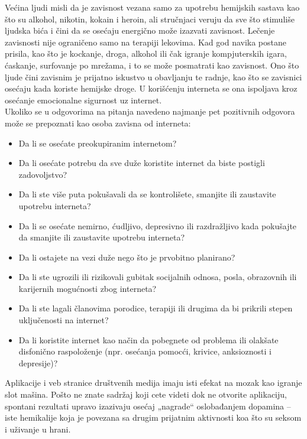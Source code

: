 \documentclass[a4paper]{article}
\begin{document}
{		Većina ljudi misli da je zavisnost vezana samo za upotrebu hemijskih sastava kao što su alkohol, nikotin, kokain i heroin, ali stručnjaci veruju da sve što stimuliše ljudska bića i čini da se osećaju energično može izazvati zavisnost. Lečenje zavisnosti nije ograničeno samo na terapiji lekovima. Kad god navika postane prisila, kao što je kockanje, droga, alkohol ili čak igranje kompjuterskih igara, ćaskanje, surfovanje po mrežama, i to se može posmatrati kao zavisnost. Ono što ljude čini zavisnim je prijatno iskustvo u obavljanju te radnje, kao što se zavisnici osećaju kada koriste hemijske droge. U korišćenju interneta se ona ispoljava kroz osećanje emocionalne sigurnost uz internet.\\
		Ukoliko se u odgovorima na pitanja navedeno najmanje pet pozitivnih odgovora može se prepoznati kao osoba zavisna od interneta:
		\begin{itemize}
			\item
			Da li se osećate preokupiranim internetom?
			\item
			Da li osećate potrebu da sve duže koristite internet da biste postigli zadovoljstvo?
			\item
			Da li ste više puta pokušavali da se kontrolišete, smanjite ili zaustavite upotrebu interneta?
			\item
			Da li se osećate nemirno, ćudljivo, depresivno ili razdražljivo kada pokušajte da smanjite ili zaustavite upotrebu interneta?
			\item
			Da li ostajete na vezi duže nego što je prvobitno planirano?
			\item
			Da li ste ugrozili ili rizikovali gubitak socijalnih odnosa, posla, obrazovnih ili karijernih mogućnosti zbog interneta?
			\item
			Da li ste lagali članovima porodice, terapiji ili drugima da bi prikrili stepen uključenosti na internet?
			\item Da li koristite internet kao način da pobegnete od problema ili olakšate disfonično raspoloženje (npr. osećanja pomocći, krivice, anksioznosti i depresije)?
		\end{itemize}
		Aplikacije i veb stranice društvenih medija imaju isti efekat na mozak kao igranje slot mašina. Pošto ne znate sadržaj koji cete videti dok ne otvorite aplikaciju, spontani rezultati upravo izazivaju osećaj „nagrade“ oslobađanjem dopamina – iste hemikalije koja je povezana sa drugim prijatnim aktivnosti koa što su seksom i uživanje u hrani.\\\\
}
\end{document}
